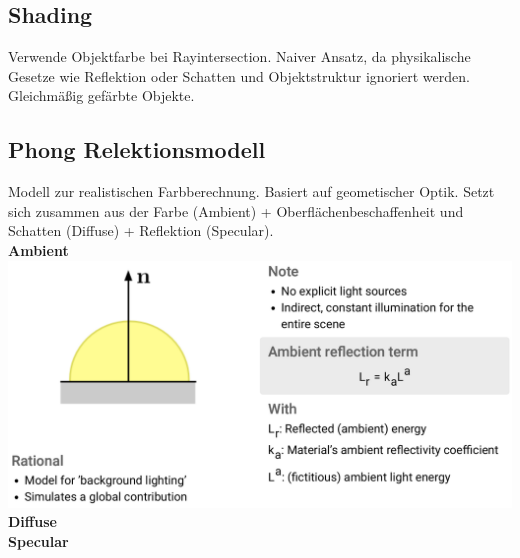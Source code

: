 \documentclass[12pt]{article}
\begin{document}
	\subsection{Shading}
	Verwende Objektfarbe bei Rayintersection. Naiver Ansatz, da physikalische Gesetze wie Reflektion oder Schatten und Objektstruktur ignoriert werden. Gleichmäßig gefärbte Objekte.

	\subsection{Phong Relektionsmodell}
	Modell zur realistischen Farbberechnung. Basiert auf geometischer Optik. Setzt sich zusammen aus der Farbe (Ambient) + Oberflächenbeschaffenheit und Schatten (Diffuse) + Reflektion (Specular).\\
	\textbf{Ambient}\\
	\includegraphics[width=\linewidth]{figures/phong-ambient.png}\\
	\textbf{Diffuse}\\
	\textbf{Specular}\\


\end{document}
